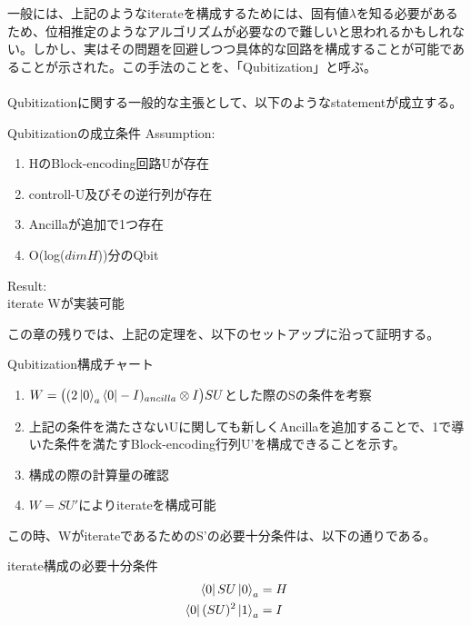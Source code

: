 \documentclass[a4paper,10.5pt]{article}
\numberwithin{equation}{section}
\begin{document}
一般には、上記のようなiterateを構成するためには、固有値$\lambda$を知る必要があるため、位相推定のようなアルゴリズムが必要なので難しいと思われるかもしれない。しかし、実はその問題を回避しつつ具体的な回路を構成することが可能であることが示された。この手法のことを、「Qubitization」と呼ぶ。\\
\\
Qubitizationに関する一般的な主張として、以下のようなstatementが成立する。
\begin{theorembox}{Qubitizationの成立条件}
Assumption:
    \begin{enumerate}
        \item HのBlock-encoding回路Uが存在
        \item controll-U及びその逆行列が存在
        \item Ancillaが追加で1つ存在
        \item O(log($dim H$))分のQbit
    \end{enumerate}
    Result:\\
    iterate Wが実装可能
\end{theorembox}
この章の残りでは、上記の定理を、以下のセットアップに沿って証明する。
\begin{setupbox}{Qubitization構成チャート}
    \begin{enumerate}
        \item $W=\big((2\ket{0}_{a}\bra{0}-I)_{ancilla}\otimes I\big)S U$とした際のSの条件を考察
        \item 上記の条件を満たさないUに関しても新しくAncillaを追加することで、1で導いた条件を満たすBlock-encoding行列U'を構成できることを示す。
        \item 構成の際の計算量の確認
        \item $W=SU'$によりiterateを構成可能
    \end{enumerate}
\end{setupbox}
この時、WがiterateであるためのS'の必要十分条件は、以下の通りである。
\begin{resultbox}{iterate構成の必要十分条件}
    \begin{align*}
        \bra{0}SU\ket{0}_{a}&=H\\
        \bra{0}(SU)^{2}\ket{1}_{a}&=I
    \end{align*}
\end{resultbox}
\end{document}
